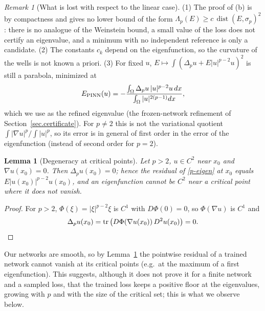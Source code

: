 \documentclass[10pt]{amsart}
\newenvironment{revblock}{\color{blue}}{}
\theoremstyle{definition}
\theoremstyle{remark}
\newtheorem{remark}{Remark}
\theoremstyle{plain}
\newtheorem{lemma}[theorem]{Lemma}
\DeclareMathOperator{\dist}{dist}
\begin{document}
\begin{revblock}
\begin{remark}[What is lost with respect to the linear case]\label{rem.plap.lost}
(1) The proof of (b) is by compactness and gives no lower bound of the form
$\Lambda_p(E)\ge c\,\dist(E,\sigma_p)^2$: there is no analogue of the Weinstein bound, a small value
of the loss does not certify an eigenvalue, and a minimum with no independent reference is only a
candidate. (2) The constants $c_k$ depend on the eigenfunction, so the curvature of the wells is not
known a priori. (3) For fixed $u$, $E\mapsto\int(\Delta_pu+E|u|^{p-2}u)^2$ is still a parabola,
minimized at
\[
E_{\rm PINN}(u)=-\frac{\int_\Omega\Delta_pu\,|u|^{p-2}u\,dx}{\int_\Omega|u|^{2(p-1)}dx},
\]
which we use as the refined eigenvalue (the frozen-network refinement of
Section~\ref{sec.certificate}). For $p\ne2$ this is not the variational quotient
$\int|\nabla u|^p/\int|u|^p$, so its error is in general of first order in the error of the
eigenfunction (instead of second order for $p=2$).
\end{remark}

\begin{lemma}[Degeneracy at critical points]\label{lem.critical}
Let $p>2$, $u\in C^2$ near $x_0$ and $\nabla u(x_0)=0$. Then $\Delta_pu(x_0)=0$; hence the residual
of \eqref{p-eigen} at $x_0$ equals $E|u(x_0)|^{p-2}u(x_0)$, and an eigenfunction cannot be $C^2$ near
a critical point where it does not vanish.
\end{lemma}
\begin{proof}
For $p>2$, $\Phi(\xi)=|\xi|^{p-2}\xi$ is $C^1$ with $D\Phi(0)=0$, so $\Phi(\nabla u)$ is $C^1$ and
\[
\Delta_pu(x_0)=\operatorname{tr}\big(D\Phi(\nabla u(x_0))\,D^2u(x_0)\big)=0. \qedhere
\]
\end{proof}
Our networks are smooth, so by Lemma~\ref{lem.critical} the pointwise residual of a trained network
cannot vanish at its critical points (e.g.\ at the maximum of a first eigenfunction). This suggests,
although it does not prove it for a finite network and a sampled loss, that the trained loss keeps a
positive floor at the eigenvalues, growing with $p$ and with the size of the critical set; this is
what we observe below.


\end{revblock}
\end{document}
